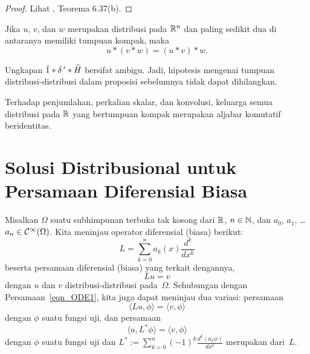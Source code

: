 \begin{proof} Lihat \cite{Rudin:1991}, Teorema 6.37(b).  \ns
\end{proof}

\begin{prop}\label{prop_assoc_convol_distr} Jika $u$, $v$, dan $w$ merupakan distribusi pada $\mathbb{R}^n$ dan paling sedikit dua di antaranya memiliki
tumpuan kompak, maka
    \[ u \ast (v \ast w) = (u \ast v) \ast w. \]
\end{prop}

\begin{exam} Ungkapan $\tilde 1 \ast \delta\,' \ast \widetilde{H}$ bersifat ambigu. Jadi, hipotesis mengenai tumpuan
distribusi-distribusi dalam proposisi sebelumnya tidak dapat dihilangkan.
\end{exam}

\begin{prop} Terhadap penjumlahan, perkalian skalar, dan konvolusi, keluarga semua distribusi pada $\mathbb{R}$ yang bertumpuan kompak
merupakan aljabar komutatif beridentitas.
\end{prop}













\section{Solusi Distribusional untuk Persamaan Diferensial Biasa}

\begin{notn} Misalkan $\Omega$ suatu subhimpunan terbuka tak kosong dari $\mathbb{R}$, $n \in \mathbb{N}$, dan $a_0$, $a_1$, \dots $a_n \in \mathcal{C}^\infty(\Omega)$.
Kita meninjau operator diferensial (biasa)
berikut:
   \[ L = \sum_{k=0}^n a_k(x)\frac{d^k}{dx^k} \]
beserta persamaan diferensial (biasa)
yang terkait dengannya,
   \begin{equation}\label{eqn_ODE1}
        Lu = v
   \end{equation}
dengan $u$ dan $v$ distribusi-distribusi pada~$\Omega$. Sehubungan dengan Persamaan~\eqref{eqn_ODE1}, kita juga dapat meninjau dua variasi:
persamaan
   \begin{equation}\label{eqn_ODE2}
        \langle Lu, \phi\rangle = \langle v, \phi\rangle
   \end{equation}
dengan $\phi$ suatu fungsi uji, dan persamaan
   \begin{equation}\label{eqn_ODE3}
        \langle u, L^*\phi\rangle = \langle v, \phi\rangle
   \end{equation}
dengan $\phi$ suatu fungsi uji dan $L^* := \displaystyle\sum_{k=0}^n (-1)^k \frac{d^k(a_k\phi)}{dx^k}$ merupakan
 dari~$L$.
\end{notn}

